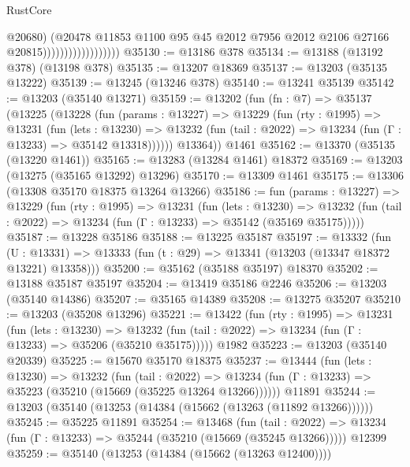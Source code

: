 \begin{lexlean}{RustCore}
\begin{coremodule}
                                        @20680)
                                      (@20478
                                        @11853
                                        @1100
                                        @95
                                        @45
                                        @2012
                                        @7956
                                        @2012
                                        @2106
                                        @27166
                                        @20815))))))))))))))))))
@35130 := @13186 @378
@35134 := @13188 (@13192 @378) (@13198 @378)
@35135 := @13207 @18369
@35137 := @13203 (@35135 @13222)
@35139 := @13245 (@13246 @378)
@35140 := @13241 @35139
@35142 := @13203 (@35140 @13271)
@35159 := @13202
    (fun (fn : @7) =>
    @35137
      (@13225
        (@13228
          (fun (params : @13227) =>
          @13229
            (fun (rty : @1995) =>
            @13231
              (fun (lets : @13230) =>
              @13232 (fun (tail : @2022) => @13234 (fun (Γ : @13233) => @35142 @13318))))))
        @13364))
    @1461
@35162 := @13370 (@35135 (@13220 @1461))
@35165 := @13283 (@13284 @1461) @18372
@35169 := @13203 (@13275 (@35165 @13292) @13296)
@35170 := @13309 @1461
@35175 := @13306 (@13308 @35170 @18375 @13264 @13266)
@35186 := fun (params : @13227) =>
  @13229
    (fun (rty : @1995) =>
    @13231
      (fun (lets : @13230) =>
      @13232 (fun (tail : @2022) => @13234 (fun (Γ : @13233) => @35142 (@35169 @35175)))))
@35187 := @13228 @35186
@35188 := @13225 @35187
@35197 := @13332
    (fun (U : @13331) => @13333 (fun (t : @29) => @13341 (@13203 (@13347 @18372 @13221) @13358)))
@35200 := @35162 (@35188 @35197) @18370
@35202 := @13188 @35187 @35197
@35204 := @13419 @35186 @2246
@35206 := @13203 (@35140 @14386)
@35207 := @35165 @14389
@35208 := @13275 @35207
@35210 := @13203 (@35208 @13296)
@35221 := @13422
    (fun (rty : @1995) =>
    @13231
      (fun (lets : @13230) =>
      @13232 (fun (tail : @2022) => @13234 (fun (Γ : @13233) => @35206 (@35210 @35175)))))
    @1982
@35223 := @13203 (@35140 @20339)
@35225 := @15670 @35170 @18375
@35237 := @13444
    (fun (lets : @13230) =>
    @13232
      (fun (tail : @2022) =>
      @13234 (fun (Γ : @13233) => @35223 (@35210 (@15669 (@35225 @13264 @13266))))))
    @11891
@35244 := @13203 (@35140 (@13253 (@14384 (@15662 (@13263 (@11892 @13266))))))
@35245 := @35225 @11891
@35254 := @13468
    (fun (tail : @2022) => @13234 (fun (Γ : @13233) => @35244 (@35210 (@15669 (@35245 @13266)))))
    @12399
@35259 := @35140 (@13253 (@14384 (@15662 (@13263 @12400))))

\end{coremodule}
\end{lexlean}
